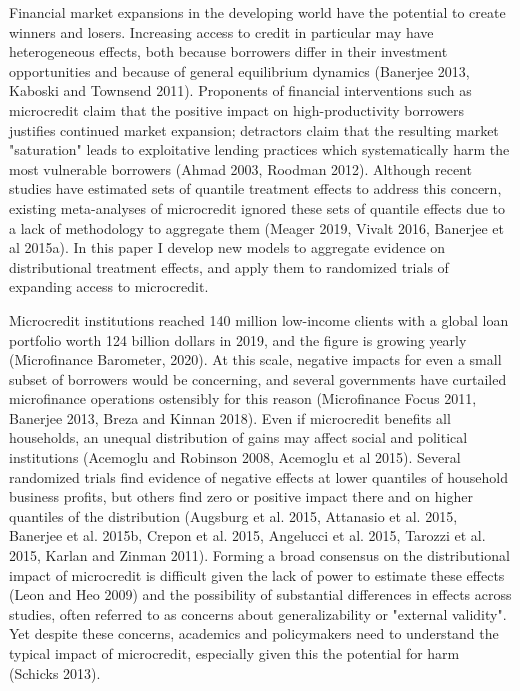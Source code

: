 \documentclass[AER]{AEA}
\begin{document}
\maketitle

Financial market expansions in the developing world have the potential to create winners and losers. Increasing access to credit in particular may have heterogeneous effects, both because borrowers differ in their investment opportunities and because of general equilibrium dynamics (Banerjee 2013, Kaboski and Townsend 2011). Proponents of financial interventions such as microcredit claim that the positive impact on high-productivity borrowers justifies continued market expansion; detractors claim that the resulting market "saturation" leads to exploitative lending practices which systematically harm the most vulnerable borrowers (Ahmad 2003, Roodman 2012). Although recent studies have estimated sets of quantile treatment effects to address this concern, existing meta-analyses of microcredit ignored these sets of quantile effects due to a lack of methodology to aggregate them (Meager 2019, Vivalt 2016, Banerjee et al 2015a). In this paper I develop new models to aggregate evidence on distributional treatment effects, and apply them to randomized trials of expanding access to microcredit.

Microcredit institutions reached 140 million low-income clients with a global loan portfolio worth 124 billion dollars in 2019, and the figure is growing yearly (Microfinance Barometer, 2020). At this scale, negative impacts for even a small subset of borrowers would be concerning, and several governments have curtailed microfinance operations ostensibly for this reason (Microfinance Focus 2011, Banerjee 2013, Breza and Kinnan 2018). Even if microcredit benefits all households, an unequal distribution of gains may affect social and political institutions (Acemoglu and Robinson 2008, Acemoglu et al 2015). Several randomized trials find evidence of negative effects at lower quantiles of household business profits, but others find zero or positive impact there and on higher quantiles of the distribution (Augsburg et al. 2015, Attanasio et al. 2015, Banerjee et al. 2015b, Crepon et al. 2015, Angelucci et al. 2015, Tarozzi et al. 2015, Karlan and Zinman 2011). Forming a broad consensus on the distributional impact of microcredit is difficult given the lack of power to estimate these effects (Leon and Heo 2009) and the possibility of substantial differences in effects across studies, often referred to as concerns about generalizability or "external validity". Yet despite these concerns, academics and policymakers need to understand the typical impact of microcredit, especially given this the potential for harm (Schicks 2013).
\end{document}

